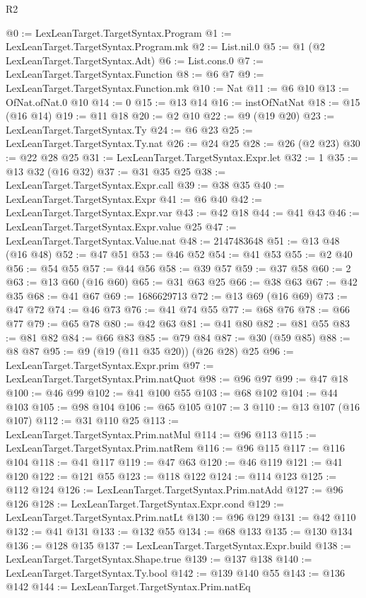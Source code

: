\begin{lexlean}{R2}
\begin{coremodule}
@0 := LexLeanTarget.TargetSyntax.Program
@1 := LexLeanTarget.TargetSyntax.Program.mk
@2 := List.nil.{0}
@5 := @1 (@2 LexLeanTarget.TargetSyntax.Adt)
@6 := List.cons.{0}
@7 := LexLeanTarget.TargetSyntax.Function
@8 := @6 @7
@9 := LexLeanTarget.TargetSyntax.Function.mk
@10 := Nat
@11 := @6 @10
@13 := OfNat.ofNat.{0} @10
@14 := 0
@15 := @13 @14
@16 := instOfNatNat
@18 := @15 (@16 @14)
@19 := @11 @18
@20 := @2 @10
@22 := @9 (@19 @20)
@23 := LexLeanTarget.TargetSyntax.Ty
@24 := @6 @23
@25 := LexLeanTarget.TargetSyntax.Ty.nat
@26 := @24 @25
@28 := @26 (@2 @23)
@30 := @22 @28 @25
@31 := LexLeanTarget.TargetSyntax.Expr.let
@32 := 1
@35 := @13 @32 (@16 @32)
@37 := @31 @35 @25
@38 := LexLeanTarget.TargetSyntax.Expr.call
@39 := @38 @35
@40 := LexLeanTarget.TargetSyntax.Expr
@41 := @6 @40
@42 := LexLeanTarget.TargetSyntax.Expr.var
@43 := @42 @18
@44 := @41 @43
@46 := LexLeanTarget.TargetSyntax.Expr.value @25
@47 := LexLeanTarget.TargetSyntax.Value.nat
@48 := 2147483648
@51 := @13 @48 (@16 @48)
@52 := @47 @51
@53 := @46 @52
@54 := @41 @53
@55 := @2 @40
@56 := @54 @55
@57 := @44 @56
@58 := @39 @57
@59 := @37 @58
@60 := 2
@63 := @13 @60 (@16 @60)
@65 := @31 @63 @25
@66 := @38 @63
@67 := @42 @35
@68 := @41 @67
@69 := 1686629713
@72 := @13 @69 (@16 @69)
@73 := @47 @72
@74 := @46 @73
@76 := @41 @74 @55
@77 := @68 @76
@78 := @66 @77
@79 := @65 @78
@80 := @42 @63
@81 := @41 @80
@82 := @81 @55
@83 := @81 @82
@84 := @66 @83
@85 := @79 @84
@87 := @30 (@59 @85)
@88 := @8 @87
@95 := @9 (@19 (@11 @35 @20)) (@26 @28) @25
@96 := LexLeanTarget.TargetSyntax.Expr.prim
@97 := LexLeanTarget.TargetSyntax.Prim.natQuot
@98 := @96 @97
@99 := @47 @18
@100 := @46 @99
@102 := @41 @100 @55
@103 := @68 @102
@104 := @44 @103
@105 := @98 @104
@106 := @65 @105
@107 := 3
@110 := @13 @107 (@16 @107)
@112 := @31 @110 @25
@113 := LexLeanTarget.TargetSyntax.Prim.natMul
@114 := @96 @113
@115 := LexLeanTarget.TargetSyntax.Prim.natRem
@116 := @96 @115
@117 := @116 @104
@118 := @41 @117
@119 := @47 @63
@120 := @46 @119
@121 := @41 @120
@122 := @121 @55
@123 := @118 @122
@124 := @114 @123
@125 := @112 @124
@126 := LexLeanTarget.TargetSyntax.Prim.natAdd
@127 := @96 @126
@128 := LexLeanTarget.TargetSyntax.Expr.cond
@129 := LexLeanTarget.TargetSyntax.Prim.natLt
@130 := @96 @129
@131 := @42 @110
@132 := @41 @131
@133 := @132 @55
@134 := @68 @133
@135 := @130 @134
@136 := @128 @135
@137 := LexLeanTarget.TargetSyntax.Expr.build
@138 := LexLeanTarget.TargetSyntax.Shape.true
@139 := @137 @138
@140 := LexLeanTarget.TargetSyntax.Ty.bool
@142 := @139 @140 @55
@143 := @136 @142
@144 := LexLeanTarget.TargetSyntax.Prim.natEq

\end{coremodule}
\end{lexlean}
